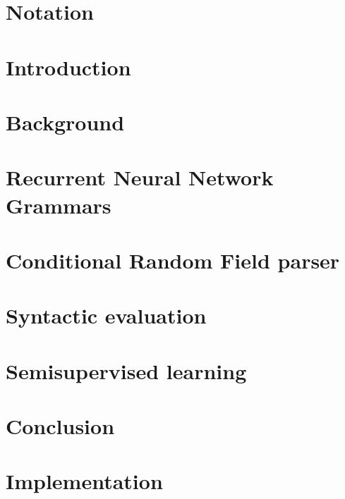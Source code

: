 \documentclass{uvamath}
\theoremstyle{remark}
\theoremstyle{definition}
\theoremstyle{definition}
\theoremstyle{definition}
\theoremstyle{definition}
\theoremstyle{definition}
\begin{document}
{\hypersetup{linkcolor=black}
\tableofcontents
}

\chapter*{Notation}



\chapter{Introduction}
\label{01-introduction}



\chapter{Background}
\label{02-background}



\chapter{Recurrent Neural Network Grammars}
\label{03-rnng}



\chapter{Conditional Random Field parser}
\label{04-crf}



\chapter{Syntactic evaluation}
\label{06-syneval}



\chapter{Semisupervised learning}
\label{05-semisupervised}



\chapter{Conclusion}
\label{07-conclusion}



\appendix

\chapter{Implementation}
\label{A2-implementation}

\end{document}
